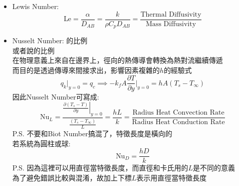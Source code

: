 \documentclass[../main.tex]{subfiles}
\begin{document}
\begin{itemize}
\begin{itemize}
    \begin{equation}
      \text{Sc} = \left(\frac{\delta}{\delta_m}\right)^3 = \left(\frac{\text{Momentum Boundary Layer}}{\text{Mass Boundary Layer}}\right)^3
    \end{equation}
    用於質傳經驗式
    \begin{equation}
      \begin{cases}
        \text{Sc} > 1 & \delta > \delta_m, \text{大部分液體溶質, 水(2.6～8.0)} \\
        \text{Sc} < 1 & \delta < \delta_m, \text{氣體溶質, 空氣(0.6～0.8)} \\
        \text{Sc} = 1 & \delta = \delta_m, \text{超臨界流體，水蒸氣}
      \end{cases}
    \end{equation}
  \item Lewis Number:
    \begin{equation}
      \text{Le} = \frac{\alpha}{D_{AB}} = \frac{k}{\rho C_p D_{AB}} = \frac{\text{Thermal Diffusivity}}{\text{Mass Diffusivity}}
    \end{equation}
  \item Nusselt Number: 的比例\\
    或者說的比例\\
    在物理意義上來自在邊界上，徑向的熱傳導會轉換為熱對流繼續傳遞\\
    而目的是透過傳導來間接求出，影響因素複雜的$h$的經驗式
    \begin{equation}
      \boxed{q_k\big|_{y=0} = q_c} \implies 
      \boxed{-k_fA\frac{\partial T}{\partial y}\bigg|_{y=0} = hA\left(T_s - T_\infty\right)}
    \end{equation}
    因此Nusselt Number可寫成:
    \begin{equation}
      \text{Nu}_L =
      \frac{\left.\frac{\partial \left(T_s -T\right)}{\partial y}\right|_{y=0}}{\frac{\left(T_s-T_\infty\right)}{L}} 
      = \frac{hL}{k} = \frac{\text{Radius Heat Convection Rate}}{\text{Radius Heat Conduction Rate}}
    \end{equation}
    P.S. 不要和Biot Number搞混了，特徵長度是橫向的\\
    若系統為圓柱或球:
    \begin{equation}
      \text{Nu}_D = \frac{hD}{k}
    \end{equation}
    P.S. 因為這裡可以用直徑當特徵長度，而直徑和卡氏用的$L$是不同的意義\\
    為了避免錯誤比較與混淆，故加上下標$L$表示用直徑當特徵長度

\end{itemize}
\end{itemize}
\end{document}
